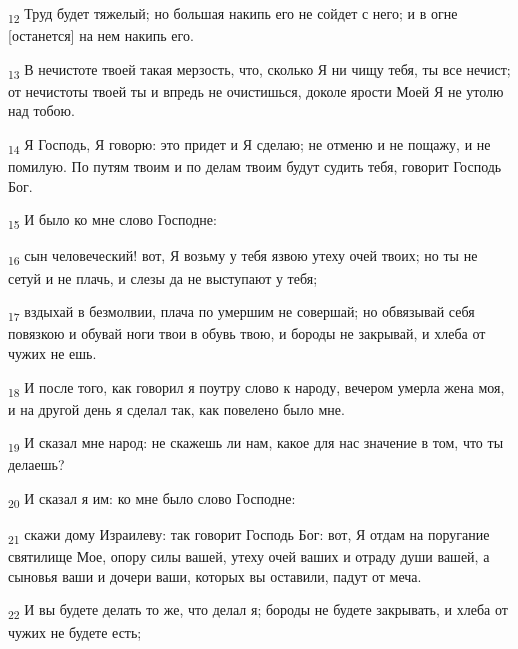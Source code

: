 \begin{tcolorbox}
\textsubscript{12} Труд будет тяжелый; но большая накипь его не сойдет с него; и в огне [останется] на нем накипь его.
\end{tcolorbox}
\begin{tcolorbox}
\textsubscript{13} В нечистоте твоей такая мерзость, что, сколько Я ни чищу тебя, ты все нечист; от нечистоты твоей ты и впредь не очистишься, доколе ярости Моей Я не утолю над тобою.
\end{tcolorbox}
\begin{tcolorbox}
\textsubscript{14} Я Господь, Я говорю: это придет и Я сделаю; не отменю и не пощажу, и не помилую. По путям твоим и по делам твоим будут судить тебя, говорит Господь Бог.
\end{tcolorbox}
\begin{tcolorbox}
\textsubscript{15} И было ко мне слово Господне:
\end{tcolorbox}
\begin{tcolorbox}
\textsubscript{16} сын человеческий! вот, Я возьму у тебя язвою утеху очей твоих; но ты не сетуй и не плачь, и слезы да не выступают у тебя;
\end{tcolorbox}
\begin{tcolorbox}
\textsubscript{17} вздыхай в безмолвии, плача по умершим не совершай; но обвязывай себя повязкою и обувай ноги твои в обувь твою, и бороды не закрывай, и хлеба от чужих не ешь.
\end{tcolorbox}
\begin{tcolorbox}
\textsubscript{18} И после того, как говорил я поутру слово к народу, вечером умерла жена моя, и на другой день я сделал так, как повелено было мне.
\end{tcolorbox}
\begin{tcolorbox}
\textsubscript{19} И сказал мне народ: не скажешь ли нам, какое для нас значение в том, что ты делаешь?
\end{tcolorbox}
\begin{tcolorbox}
\textsubscript{20} И сказал я им: ко мне было слово Господне:
\end{tcolorbox}
\begin{tcolorbox}
\textsubscript{21} скажи дому Израилеву: так говорит Господь Бог: вот, Я отдам на поругание святилище Мое, опору силы вашей, утеху очей ваших и отраду души вашей, а сыновья ваши и дочери ваши, которых вы оставили, падут от меча.
\end{tcolorbox}
\begin{tcolorbox}
\textsubscript{22} И вы будете делать то же, что делал я; бороды не будете закрывать, и хлеба от чужих не будете есть;
\end{tcolorbox}

